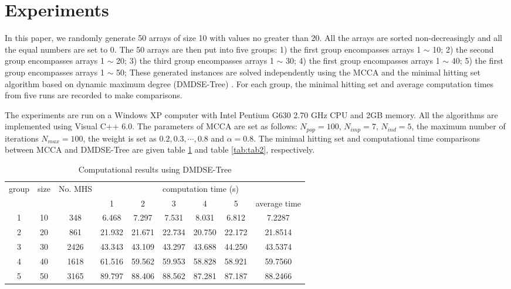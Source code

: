 \section{Experiments}
In this paper, we randomly generate 50 arrays of size 10 with values no greater than 20.
All the arrays are sorted non-decreasingly and all the equal numbers are set to 0.
The 50 arrays are then put into five groups: 1) the first group encompasses arrays 1 $\sim$ 10; 2) the second group encompasses arrays 1 $\sim$ 20; 3) the third group encompasses arrays 1 $\sim$ 30; 4) the first group encompasses arrays 1 $\sim$ 40; 5) the first group encompasses arrays 1 $\sim$ 50;
These generated instances are solved independently using the MCCA and the minimal hitting set algorithm based on dynamic maximum degree (DMDSE-Tree) \citep{c7zhang}.
For each group, the minimal hitting set and average computation times from five runs are recorded to make comparisons.

The experiments are run on a Windows XP computer with Intel Pentium G630 2.70 GHz CPU and 2GB memory.
All the algorithms are implemented using Visual C++ 6.0.
The parameters of MCCA are set as follows: $N_{pop} = 100$, $N_{imp} = 7$, $N_{ind} = 5$, the maximum number of iterations $N_{max} = 100$, the weight is set as $0.2, 0.3, \cdots, 0.8$ and $\alpha = 0.8$.
The minimal hitting set and computational time comparisons between MCCA and DMDSE-Tree are given table \ref{tab:tab1} and table \ref{tab:tab2}, respectively.


\begin{table}[h!]
	\begin{center}
		\caption{Computational results using DMDSE-Tree}
		\label{tab:tab1}
		\begin{tabular}{ccccccccc}
			\hline
			\multirow{2}{*}{group} & \multirow{2}{*}{size} & \multirow{2}{*}{No. MHS} & \multicolumn{6}{c}{computation time (s)} \\
			\cline{4-9}
			& & & 1 & 2 & 3 & 4 &5 & average time \\
			\hline 
			1 & 10 & 348  & 6.468  & 7.297  & 7.531  & 8.031  & 6.812  & 7.2287 \\
			2 & 20 & 861  & 21.932 & 21.671 & 22.734 & 20.750 & 22.172 & 21.8514 \\
			3 & 30 & 2426 & 43.343 & 43.109 & 43.297 & 43.688 & 44.250 & 43.5374 \\
			4 & 40 & 1618 & 61.516 & 59.562 & 59.953 & 58.828 & 58.921 & 59.7560 \\
			5 & 50 & 3165 & 89.797 & 88.406 & 88.562 & 87.281 & 87.187 & 88.2466 \\
			\hline
		\end{tabular}
	\end{center}
\end{table}



